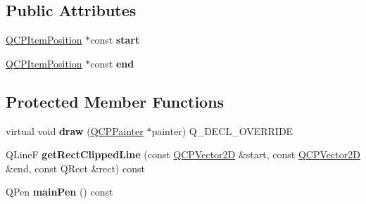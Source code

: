 \subsection*{Public Attributes}
\begin{DoxyCompactItemize}
\item 
\mbox{\label{class_q_c_p_item_line_a602da607a09498b0f152ada1d6851bc5}} 
\hyperlink{class_q_c_p_item_position}{Q\+C\+P\+Item\+Position} $\ast$const {\bfseries start}
\item 
\mbox{\label{class_q_c_p_item_line_a15598864c1c22a2497a1979c4980c4e1}} 
\hyperlink{class_q_c_p_item_position}{Q\+C\+P\+Item\+Position} $\ast$const {\bfseries end}
\end{DoxyCompactItemize}
\subsection*{Protected Member Functions}
\begin{DoxyCompactItemize}
\item 
\mbox{\label{class_q_c_p_item_line_ae184140b61b2ef5b8edde76304447200}} 
virtual void {\bfseries draw} (\hyperlink{class_q_c_p_painter}{Q\+C\+P\+Painter} $\ast$painter) Q\+\_\+\+D\+E\+C\+L\+\_\+\+O\+V\+E\+R\+R\+I\+DE
\item 
\mbox{\label{class_q_c_p_item_line_a7b00a1d82be8b961461cc4039acd12a3}} 
Q\+LineF {\bfseries get\+Rect\+Clipped\+Line} (const \hyperlink{class_q_c_p_vector2_d}{Q\+C\+P\+Vector2D} \&start, const \hyperlink{class_q_c_p_vector2_d}{Q\+C\+P\+Vector2D} \&end, const Q\+Rect \&rect) const
\item 
\mbox{\label{class_q_c_p_item_line_af8b5370462515b279578d8b4a57bd3b4}} 
Q\+Pen {\bfseries main\+Pen} () const
\end{DoxyCompactItemize}
